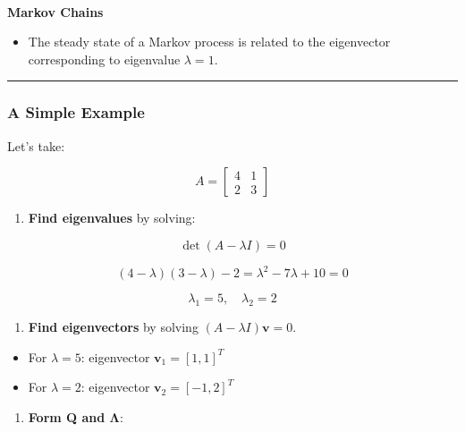 \documentclass[
  letterpaper,
  DIV=11,
  numbers=noendperiod]{scrartcl}
\makeatletter
\let\oldparagraph\paragraph
\renewcommand{\paragraph}{
    \@ifstar
      \xxxParagraphStar
      \xxxParagraphNoStar
  }
\newcommand{\xxxParagraphStar}[1]{\oldparagraph*{#1}\mbox{}}
\newcommand{\xxxParagraphNoStar}[1]{\oldparagraph{#1}\mbox{}}
\providecommand{\tightlist}{%
  \setlength{\itemsep}{0pt}\setlength{\parskip}{0pt}}\usepackage{longtable,booktabs,array}
\makeatother
\begin{document}
\paragraph{\texorpdfstring{\textbf{Markov
Chains}}{Markov Chains}}\label{markov-chains}

\begin{itemize}
\tightlist
\item
  The steady state of a Markov process is related to the eigenvector
  corresponding to eigenvalue \(\lambda = 1\).
\end{itemize}

\begin{center}\rule{0.5\linewidth}{0.5pt}\end{center}

\subsubsection{A Simple Example}\label{a-simple-example}

Let's take:

\[
A = \begin{bmatrix} 4 & 1 \\ 2 & 3 \end{bmatrix}
\]

\begin{enumerate}
\def\labelenumi{\arabic{enumi}.}
\tightlist
\item
  \textbf{Find eigenvalues} by solving:
\end{enumerate}

\[
\det(A - \lambda I) = 0
\]

\[
(4 - \lambda)(3 - \lambda) - 2 = \lambda^2 - 7\lambda + 10 = 0
\]

\[
\lambda_1 = 5, \quad \lambda_2 = 2
\]

\begin{enumerate}
\def\labelenumi{\arabic{enumi}.}
\setcounter{enumi}{1}
\tightlist
\item
  \textbf{Find eigenvectors} by solving
  \((A - \lambda I)\mathbf{v} = 0\).
\end{enumerate}

\begin{itemize}
\tightlist
\item
  For \(\lambda = 5\): eigenvector \(\mathbf{v}_1 = [1, 1]^T\)
\item
  For \(\lambda = 2\): eigenvector \(\mathbf{v}_2 = [-1, 2]^T\)
\end{itemize}

\begin{enumerate}
\def\labelenumi{\arabic{enumi}.}
\setcounter{enumi}{2}
\tightlist
\item
  \textbf{Form Q and Λ}:
\end{enumerate}
\end{document}
